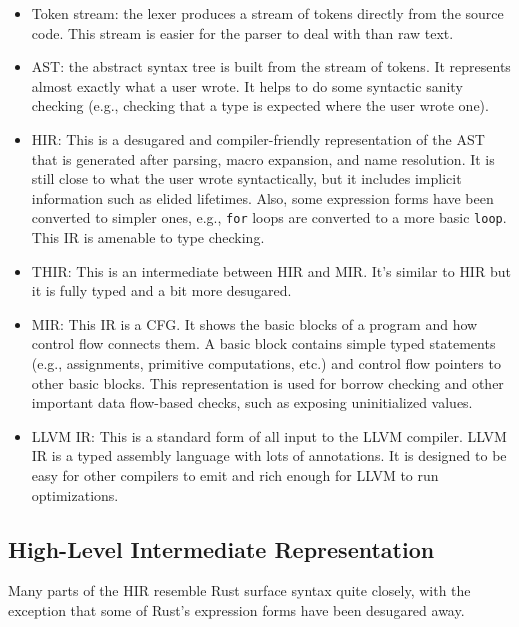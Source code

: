 \documentclass[paper=a4,%
  twoside,%
  BCOR4mm,%
  abstract=true,%
  toc=bibliography,%
  chapterprefix=true,%
  toc=bibliographynumbered,%
  open=right,%
  english,%
  pagesize=pdftex]{scrreprt}
\newcommand{\hir}{\ac{HIR}\xspace}
\newcommand{\mir}{\ac{MIR}\xspace}
\newcommand{\cfg}{\ac{CFG}\xspace}
\begin{document}
\begin{itemize}
    \item Token stream: the lexer produces a stream of tokens directly from the source code. This stream is easier for the parser to deal with than raw text.
    \item \ac{AST}: the abstract syntax tree is built from the stream of tokens. It represents almost exactly what a user wrote. It helps to do some syntactic sanity checking (e.g., checking that a type is expected where the user wrote one).
    \item \hir: This is a desugared and compiler-friendly representation of the \ac{AST} that is generated after parsing, macro expansion, and name resolution. It is still close to what the user wrote syntactically, but it includes implicit information such as elided lifetimes. Also, some expression forms have been converted to simpler ones, e.g., \texttt{for} loops are converted to a more basic \texttt{loop}. This \ac{IR} is amenable to type checking.
    \item \ac{THIR}: This is an intermediate between \hir and \mir. It's similar to \hir but it is fully typed and a bit more desugared.
    \item \mir: This \ac{IR} is a \cfg. It shows the basic blocks of a program and how control flow connects them. A basic block contains simple typed statements (e.g., assignments, primitive computations, etc.) and control flow pointers to other basic blocks. This representation is used for borrow checking and other important data flow-based checks, such as exposing uninitialized values.
    \item LLVM \ac{IR}: This is a standard form of all input to the LLVM compiler. LLVM \ac{IR} is a typed assembly language with lots of annotations. It is designed to be easy for other compilers to emit and rich enough for LLVM to run optimizations.
\end{itemize}

\subsection{High-Level Intermediate Representation}
Many parts of the \hir resemble Rust surface syntax quite closely, with the exception that some of Rust's expression forms have been desugared away. 
\end{document}
